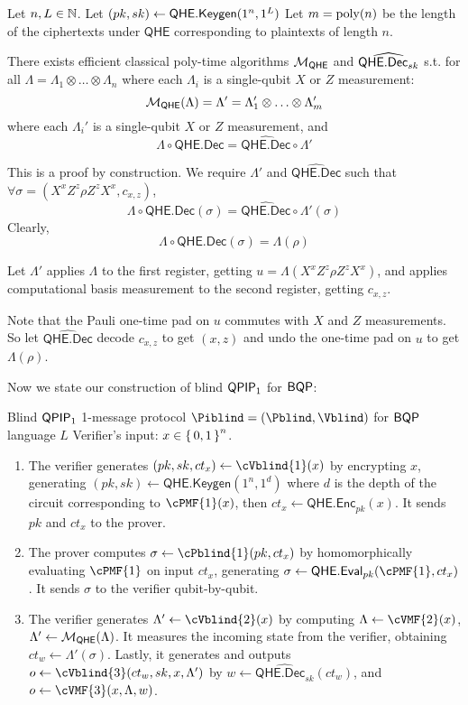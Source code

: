 \begin{thm}
	\label{decodeMeasureOrder}
	Let $n, L\in\mathbb{N}$.
	Let $(pk, sk)\leftarrow\mathsf{QHE.Keygen}(1^n, 1^L)$
	Let $m=\operatorname*{\operatorname{poly}}(n)$ be the length of the ciphertexts under $\mathsf{QHE}$ corresponding to plaintexts of length $n$.
	
	There exists efficient classical poly-time algorithms ${\cal M}_{\mathsf{QHE}}$ and $\widehat{\mathsf{QHE.Dec}_{sk}}$ s.t.
	for all $\Lambda=\Lambda_1\otimes\ldots\otimes\Lambda_n$ where each $\Lambda_i$ is a single-qubit $X$ or $Z$ measurement:
	$${\cal M}_{\mathsf{QHE}}(\Lambda)=\Lambda'=\Lambda'_1\otimes\ldots\otimes\Lambda'_m$$
	where each $\Lambda_i'$ is a single-qubit $X$ or $Z$ measurement, and
	$$\Lambda\circ\mathsf{QHE.Dec}=\widehat{\mathsf{QHE.Dec}}\circ\Lambda'$$
\end{thm}
\begin{prf}
	This is a proof by construction.
	We require $\Lambda'$ and $\widehat{\mathsf{QHE.Dec}}$ such that $\forall\sigma=(X^xZ^z\rho Z^zX^x, c_{x,z})$,
	$$\Lambda\circ\mathsf{QHE.Dec}(\sigma)=\widehat{\mathsf{QHE.Dec}}\circ\Lambda'(\sigma)$$
	Clearly,
	$$\Lambda\circ\mathsf{QHE.Dec}(\sigma)=\Lambda(\rho)$$
	
	Let $\Lambda'$ applies $\Lambda$ to the first register, getting $u=\Lambda(X^xZ^z\rho Z^zX^x)$, and applies computational basis measurement to the second register, getting $c_{x, z}$.

	Note that the Pauli one-time pad on $u$ commutes with $X$ and $Z$ measurements.
	So let $\widehat{\mathsf{QHE.Dec}}$ decode $c_{x, z}$ to get $(x, z)$ and undo the one-time pad on $u$ to get $\Lambda(\rho)$.
\end{prf}

Now we state our construction of blind $\operatorname{\mathsf{QPIP}}_1$ for $\operatorname{\mathsf{BQP}}$:

\begin{protocol}{Blind $\operatorname{\mathsf{QPIP}}_1$ 1-message protocol $\Piblind = (\Pblind, \Vblind)$ for $\operatorname{\mathsf{BQP}}$ language $L$}
	\label{proto:BlindBQP}
	Verifier's input: $x\in\set{0,1}^n$.
	
	\begin{enumerate}
		\item The verifier generates $(pk, sk, ct_x)\leftarrow\cVblind{1}(x)$ by encrypting $x$, generating
			$(pk, sk)\leftarrow\mathsf{QHE.Keygen}(1^n, 1^d)$ where $d$ is the depth of the circuit corresponding to $\cPMF{1}(x)$, then
			$ct_x\leftarrow\mathsf{QHE.Enc}_{pk}(x)$.
			It sends $pk$ and $ct_x$ to the prover.
		\item The prover computes $\sigma\leftarrow\cPblind{1}(pk, ct_x)$ by homomorphically evaluating $\cPMF{1}$ on input $ct_x$, generating $\sigma\leftarrow\QEval_{pk}(\cPMF{1}, ct_x)$.
			It sends $\sigma$ to the verifier qubit-by-qubit.
		\item The verifier generates $\Lambda'\leftarrow\cVblind{2}(x)$ by computing
			$\Lambda\leftarrow\cVMF{2}(x)$,
			$\Lambda'\leftarrow{\cal M}_{\mathsf{QHE}}(\Lambda)$.
			It measures the incoming state from the verifier, obtaining $ct_w\leftarrow\Lambda'(\sigma)$.
			Lastly, it generates and outputs $o\leftarrow\cVblind{3}(ct_w, sk, x, \Lambda')$ by
			$w\leftarrow\widehat{\mathsf{QHE.Dec}_{sk}}(ct_w)$,
			and $o\leftarrow\cVMF{3}(x, \Lambda, w)$.
	\end{enumerate}
\end{protocol}

